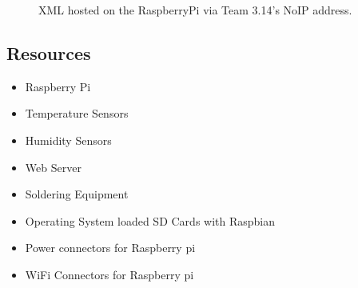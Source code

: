 \documentclass{report}
\begin{document}
\begin{figure}[H]
\caption{XML hosted on the RaspberryPi via Team 3.14's NoIP address.}
\end{figure}

\newpage


\subsection*{Resources}
\begin{itemize}
\item Raspberry Pi
\item Temperature Sensors
\item Humidity Sensors
\item Web Server
\item Soldering Equipment
\item Operating System loaded SD Cards with Raspbian
\item Power connectors for Raspberry pi
\item WiFi Connectors for Raspberry pi
\end{itemize}
\newpage
\end{document}
